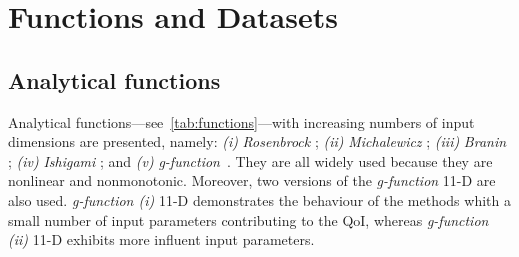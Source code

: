 
\chapter{Functions and Datasets}

\section{Analytical functions}
\label{sec:functions}

Analytical functions---see~\cref{tab:functions}---with increasing numbers of input dimensions are presented, namely: \textit{(i)} \textit{Rosenbrock} ; \textit{(ii)} \textit{Michalewicz} ; \textit{(iii)} \textit{Branin} ; \textit{(iv)} \textit{Ishigami} ; and \textit{(v)} \textit{g-function}~\cite{molga2005,ishigami1990,Saltelli2007,Legratiet2016,forrester2008a}. They are all widely used because they are nonlinear and nonmonotonic. Moreover, two versions of the \emph{g-function} 11-D are also used. \textit{g-function (i)} 11-D demonstrates the behaviour of the methods whith a small number of input parameters contributing to the QoI, whereas \textit{g-function (ii)} 11-D exhibits more influent input parameters.

